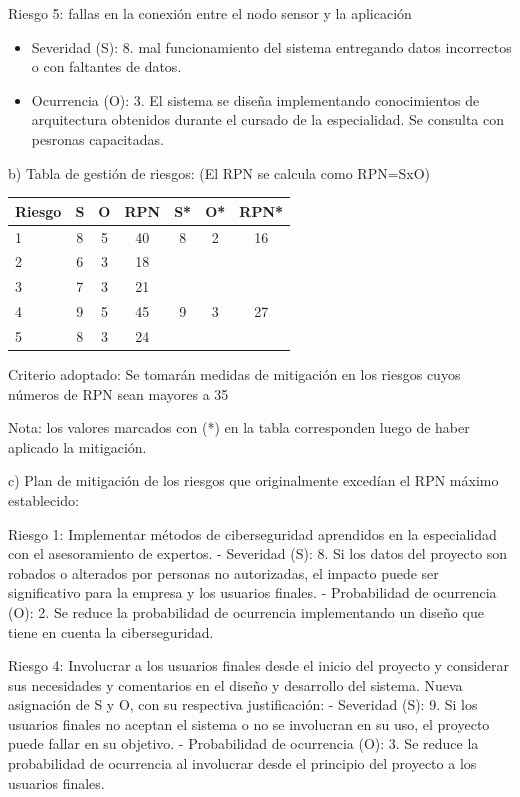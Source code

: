 \documentclass[
11pt, %
]{charter}
\begin{document}
Riesgo 5: fallas en la conexión entre el nodo sensor y la aplicación
\begin{itemize}
	\item Severidad (S): 8. mal funcionamiento del sistema entregando datos incorrectos o con faltantes de datos. 
	\item Ocurrencia (O): 3. El sistema se diseña implementando conocimientos de arquitectura obtenidos durante el cursado de la especialidad. Se consulta con pesronas capacitadas. 
\end{itemize}

b) Tabla de gestión de riesgos:      (El RPN se calcula como RPN=SxO)

\begin{table}[htpb]
\centering
\begin{tabularx}{\linewidth}{@{}|X|c|c|c|c|c|c|@{}}
\hline
\rowcolor[HTML]{C0C0C0} 
Riesgo & S & O & RPN & S* & O* & RPN* \\ \hline
1      & 8 & 5 & 40  & 8  & 2  & 16   \\ \hline
2      & 6 & 3 & 18  &    &    &      \\ \hline
3      & 7 & 3 & 21  &    &    &      \\ \hline
4      & 9 & 5 & 45  & 9  & 3  & 27   \\ \hline
5      & 8 & 3 & 24  &    &    &      \\ \hline
\end{tabularx}%
\end{table}

Criterio adoptado: 
Se tomarán medidas de mitigación en los riesgos cuyos números de RPN sean mayores a 35

Nota: los valores marcados con (*) en la tabla corresponden luego de haber aplicado la mitigación.

c) Plan de mitigación de los riesgos que originalmente excedían el RPN máximo establecido:
 
Riesgo 1: Implementar métodos de ciberseguridad aprendidos en la especialidad con el asesoramiento de expertos. 
  - Severidad (S): 8. Si los datos del proyecto son robados o alterados por personas no autorizadas, el impacto puede ser significativo para la empresa y los usuarios finales.
  - Probabilidad de ocurrencia (O): 2. Se reduce la probabilidad de ocurrencia implementando un diseño que tiene en cuenta la ciberseguridad. 

Riesgo 4: Involucrar a los usuarios finales desde el inicio del proyecto y considerar sus necesidades y comentarios en el diseño y desarrollo del sistema.
  Nueva asignación de S y O, con su respectiva justificación:
  - Severidad (S): 9. Si los usuarios finales no aceptan el sistema o no se involucran en su uso, el proyecto puede fallar en su objetivo.
  - Probabilidad de ocurrencia (O): 3. Se reduce la probabilidad de ocurrencia al involucrar desde el principio del proyecto a los usuarios finales. 
\end{document}
